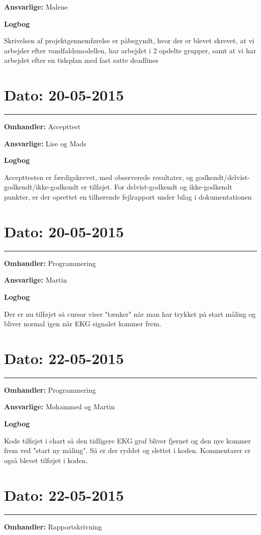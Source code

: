 \textbf{Ansvarlige:} Malene

\textbf{Logbog}

Skrivelsen af projektgennemførelse er påbegyndt, hvor der er blevet skrevet, at vi arbejder efter vandfaldsmodellen, har arbejdet i 2 opdelte grupper, samt at vi har arbejdet efter en tidsplan med fast satte deadlines

\section{Dato: 20-05-2015}
\hrule
\textbf{Omhandler:} Accepttest

\textbf{Ansvarlige:} Lise og Mads

\textbf{Logbog}

Accepttesten er færdigskrevet, med observerede resultater, og godkendt/delvist-godkendt/ikke-godkendt er tilføjet.
For delvist-godkendt og ikke-godkendt punkter, er der oprettet en tilhørende fejlrapport under bilag i dokumentationen


\section{Dato: 20-05-2015}
\hrule
\textbf{Omhandler:} Programmering

\textbf{Ansvarlige:} Martin

\textbf{Logbog}

Der er nu tilføjet så cursor viser "tænker" når man har trykket på start måling og bliver normal igen når EKG signalet kommer frem.



\section{Dato: 22-05-2015}
\hrule
\textbf{Omhandler:} Programmering

\textbf{Ansvarlige:} Mohammed og Martin

\textbf{Logbog}

Kode tilføjet i chart så den tidligere EKG graf bliver fjernet og den nye kommer frem ved "start ny måling". Så er der ryddet og slettet i koden. Kommentarer er også blevet tilføjet i koden.

\section{Dato: 22-05-2015}
\hrule

\textbf{Omhandler:} Rapportskrivning

